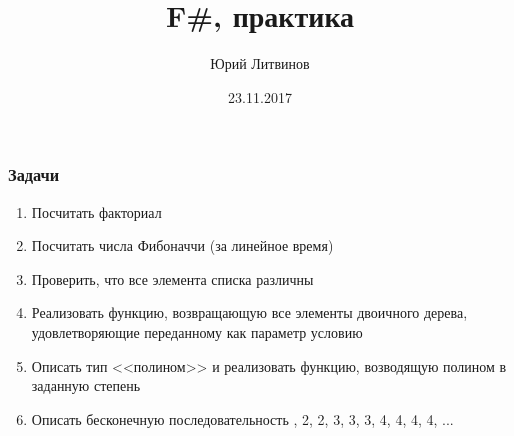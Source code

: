 \documentclass[xetex,mathserif,serif]{beamer}
\title{F\#, практика}
\author{Юрий Литвинов}
\date{23.11.2017}
\begin{document}
	\frame{\titlepage}

	\begin{frame}
		\frametitle{Задачи}
		\begin{enumerate}
			\item Посчитать факториал
			\item Посчитать числа Фибоначчи (за линейное время)
			\item Проверить, что все элемента списка различны
			\item Реализовать функцию, возвращающую все элементы двоичного дерева, удовлетворяющие переданному как параметр условию
			\item Описать тип <<полином>> и реализовать функцию, возводящую полином в заданную степень
			\item Описать бесконечную последовательность , 2, 2, 3, 3, 3, 4, 4, 4, 4, ...
		\end{enumerate}
	\end{frame}
\end{document}

